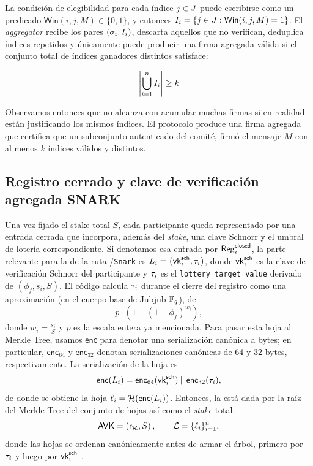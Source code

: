 La condición de elegibilidad para cada índice $j \in J$ puede escribirse como un predicado $\mathsf{Win}(i,j,M) \in \{0,1\}$, y entonces $I_i = \{j \in J: \mathsf{Win}(i, j, M) = 1 \}$. El \textit{aggregator} recibe los pares $(\sigma_i, I_i)$, descarta aquellos que no verifican, deduplica índices repetidos y únicamente puede producir una firma agregada válida si el conjunto total de índices ganadores distintos satisface:

$$\left| \bigcup_{i=1}^{n} I_i \right| \geq k$$

Observamos entonces que no alcanza con acumular muchas firmas si en realidad están justificando los mismos índices. El protocolo \STM produce una firma agregada que certifica que un subconjunto autenticado del comité, firmó el mensaje $M$ con al menos $k$ índices válidos y distintos.

\subsection{Registro cerrado y clave de verificación agregada SNARK}
\label{subsec:protocolo-stm-y-esquemas-de-firma-registro-cerrado-y-clave-de-verificacion-agregada-snark}

Una vez fijado el stake total $S$, cada participante queda representado por una entrada cerrada que incorpora, además del \textit{stake}, una clave Schnorr y el umbral de lotería correspondiente. Si denotamos esa entrada por $\mathsf{Reg}^{\mathsf{closed}}_i$, la parte relevante para la \AVK de la ruta \Lagrange/\texttt{Snark} es $L_{i} = \bigl(\mathsf{vk}^{\mathsf{sch}}_i,\tau_i\bigr)$,
donde $\mathsf{vk}^{\mathsf{sch}}_i$ es la clave de verificación Schnorr del participante y $\tau_i$ es el \texttt{lottery\_target\_value} derivado de $(\phi_f,s_i,S)$. El código calcula $\tau_i$ durante el cierre del registro como una aproximación (en el cuerpo base de Jubjub $\mathbb{F}_q$), de
$$p \cdot \left(1-(1-\phi_f)^{w_i}\right),$$
donde $w_i = \frac{s_i}{S}$ y $p$ es la escala entera ya mencionada. Para pasar esta hoja al Merkle Tree, usamos $\mathsf{enc}$ para denotar una serialización canónica a bytes; en particular, $\mathsf{enc}_{64}$ y $\mathsf{enc}_{32}$ denotan serializaciones canónicas de 64 y 32 bytes, respectivamente. La serialización de la hoja es
$$\mathsf{enc}(L_{i}) = \mathsf{enc}_{64}(\mathsf{vk}^{\mathsf{sch}}_i) \mathbin{\|} \mathsf{enc}_{32}(\tau_i),$$
de donde se obtiene la hoja $\ell_i = \mathcal{H}(\mathsf{enc}(L_{i}))$. Entonces, la \AVK está dada por la raíz del Merkle Tree del conjunto de hojas así como el \textit{stake} total:
$$\mathsf{AVK} = \left(\mathsf{r}_{\mathcal{R}}, S \right), \qquad \mathcal{L} = \{\ell_i\}_{i=1}^{n},$$
donde las hojas se ordenan canónicamente antes de armar el árbol, primero por $\tau_i$ y luego por $\mathsf{vk}^{\mathsf{sch}}_i$ \cite{MithrilSTMRepo}.


